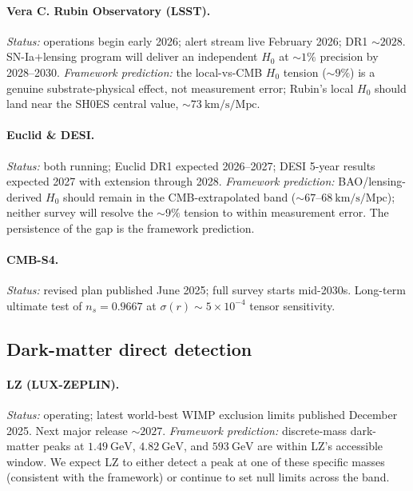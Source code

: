\documentclass[reprint,amsmath,amssymb,aps,prd,longbibliography,floatfix]{revtex4-2}
\begin{document}
\paragraph{Vera C. Rubin Observatory (LSST).}
\emph{Status:} operations begin early 2026; alert stream live
February 2026; DR1 $\sim\!2028$. SN-Ia$+$lensing program will
deliver an independent $H_0$ at $\sim\!1\%$ precision by 2028--2030.
\emph{Framework prediction:} the local-vs-CMB $H_0$ tension
($\sim\!9\%$) is a genuine substrate-physical effect, not
measurement error; Rubin's local $H_0$ should land near the
SH0ES central value, $\sim\!73~\mathrm{km/s/Mpc}$.

\paragraph{Euclid \& DESI.}
\emph{Status:} both running; Euclid DR1 expected 2026--2027; DESI
5-year results expected 2027 with extension through 2028.
\emph{Framework prediction:} BAO/lensing-derived $H_0$ should
remain in the CMB-extrapolated band ($\sim\!67$--$68~\mathrm{km/s/Mpc}$);
neither survey will resolve the $\sim\!9\%$ tension to within
measurement error. The persistence of the gap is the framework
prediction.

\paragraph{CMB-S4.}
\emph{Status:} revised plan published June 2025; full survey starts
mid-2030s. Long-term ultimate test of $n_s = 0.9667$ at $\sigma(r)
\sim 5\times 10^{-4}$ tensor sensitivity.

\subsection*{Dark-matter direct detection}

\paragraph{LZ (LUX-ZEPLIN).}
\emph{Status:} operating; latest world-best WIMP exclusion limits
published December 2025. Next major release $\sim\!2027$.
\emph{Framework prediction:} discrete-mass dark-matter peaks at
$1.49~\mathrm{GeV}$, $4.82~\mathrm{GeV}$, and $593~\mathrm{GeV}$ are
within LZ's accessible window. We expect LZ to either detect a
peak at one of these specific masses (consistent with the
framework) or continue to set null limits across the band.
\end{document}

